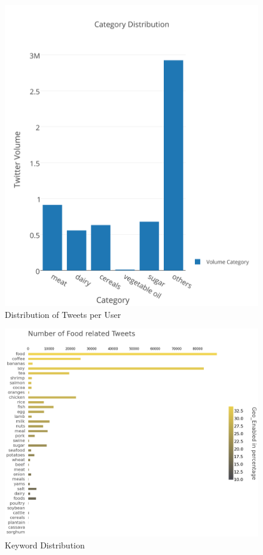 \documentclass[12pt]{report}
\begin{document}
 
 \begin{figure}[H]
\centerline{ \noindent\includegraphics[width=1\textwidth]{img/anal/exp_dist_cat}}
 \caption{Distribution of Tweets per User}
 \label{fig:tpu}
\end{figure}

  \begin{figure}[H]
\centerline{ \noindent\includegraphics[width=1\textwidth]{img/anal/n_food_tweets}}
 \caption{Keyword Distribution}
 \label{fig:keywordDistribution}
\end{figure}
 
\end{document}
